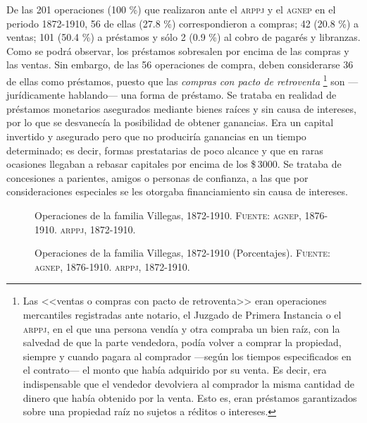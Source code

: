\documentclass[14pt,twoside,final]{extbook} %
\let\oldfootnote\footnote
\renewcommand\footnote[1]{%
\oldfootnote{\hspace{1mm}#1}}
\begin{document}
De las 201 operaciones (100 \%) que realizaron ante el \textsc{arppj} y el \textsc{agnep} en el periodo 1872-1910, 56 de ellas (27.8 \%) correspondieron a compras; 42 (20.8 \%) a ventas; 101 (50.4 \%) a préstamos y sólo 2 (0.9 \%) al cobro de pagarés y libranzas. Como se podrá observar, los préstamos sobresalen por encima de las compras y las ventas. Sin embargo, de las 56 operaciones de compra, deben considerarse 36 de ellas como préstamos, puesto que las \emph{compras con pacto de retroventa}\footnote{Las <<ventas o compras con pacto de retroventa>> eran operaciones mercantiles registradas ante notario, el Juzgado de Primera Instancia o el \textsc{arppj}, en el que una persona vendía y otra compraba un bien raíz, con la salvedad de que la parte vendedora, podía volver a comprar la propiedad, siempre y cuando pagara al comprador ---según los tiempos especificados en el contrato--- el monto que había adquirido por su venta. Es decir, era indispensable que el vendedor devolviera al comprador la misma cantidad de dinero que había obtenido por la venta. Esto es, eran préstamos garantizados sobre una propiedad raíz no sujetos a réditos o intereses.} son ---jurídicamente hablando--- una forma de préstamo. Se trataba en realidad de préstamos monetarios asegurados mediante bienes raíces y sin causa de intereses, por lo que se desvanecía la posibilidad de obtener ganancias. Era un capital invertido y asegurado pero que no produciría ganancias en un tiempo determinado; es decir, formas prestatarias de poco alcance y que en raras ocasiones llegaban a rebasar capitales por encima de los \$\,3000. Se trataba de concesiones a parientes, amigos o personas de confianza, a las que por consideraciones especiales se les otorgaba financiamiento sin causa de intereses.
\begin{figure}
\centering
{}
\caption[Operaciones de la familia Villegas, 1872-1910]{Operaciones de la familia Villegas, 1872-1910. \textsc{Fuente:} \textsc{agnep}, 1876-1910. \textsc{arppj}, 1872-1910.}
\label{fig:operaciones-villegas}
\end{figure}
\begin{figure}
\centering
{}
\caption[Operaciones de la familia Villegas, 1872-1910 (Porcentajes)]{Operaciones de la familia Villegas, 1872-1910 (Porcentajes). \textsc{Fuente:} \textsc{agnep}, 1876-1910. \textsc{arppj}, 1872-1910.}
\label{fig:porcentajes}
\end{figure}
\end{document}
